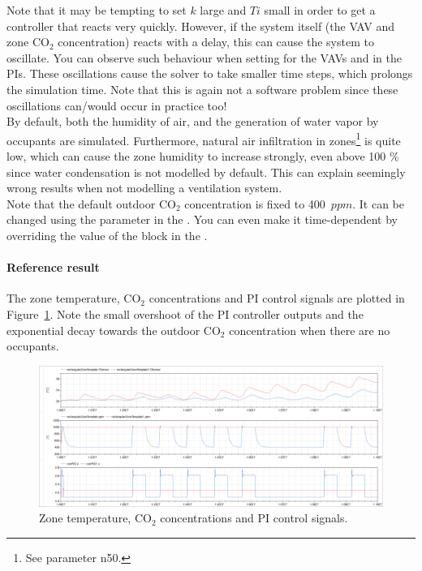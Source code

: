 \documentclass[10pt,a4paper]{article}
\begin{document}
Note that it may be tempting to set $k$ large and $Ti$ small
in order to get a controller that reacts very quickly. However,
if the system itself (the VAV and zone CO$_2$ concentration)
reacts with a delay, this can cause the system to oscillate.
You  can observe such behaviour when setting  for the VAVs and
 in the PIs.
These oscillations cause the solver to take smaller time steps, 
which prolongs the simulation time.
Note that this is again not a software problem since these oscillations can/would occur 
in practice too!\\


By default, both the humidity of air, and the generation of water
vapor by occupants are simulated.
Furthermore, natural air infiltration in zones\footnote{See parameter n50.} is quite low, 
which can cause the zone humidity to increase strongly, 
even above 100 \% since water condensation
is not modelled by default.
This can explain seemingly wrong results when not modelling
a ventilation system.\\

Note that the default outdoor CO$_2$ concentration is fixed to 400~$ppm$.
It can be changed using the parameter  in the 
. You can even make it time-dependent
by overriding the value of the  block 
in the .

\paragraph{Reference result}
The zone temperature, CO$_2$ concentrations and 
PI control signals are plotted in Figure~\ref{fig:res4}.
Note the small overshoot of the PI controller outputs
and the exponential decay towards the outdoor CO$_2$
concentration when there are no occupants.


\begin{figure}[h]
\centering
\includegraphics[width=\linewidth]{Example9.png}
\caption{Zone temperature, CO$_2$ concentrations and PI control signals.}
\label{fig:res4}
\end{figure}
\end{document}
